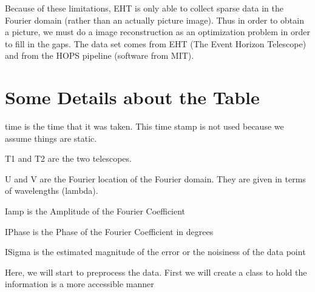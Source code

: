 \documentclass[letterpaper,10pt,english]{jupyterBook}
\begin{document}
\sphinxAtStartPar
Because of these limitations, EHT is only able to collect sparse data in the Fourier domain (rather than an actually picture image). Thus in order to obtain a picture, we must do a image reconstruction as an optimization problem in order to fill in the gaps. The data set comes from EHT (The Event Horizon Telescope) and from the HOPS pipeline (software from MIT).


\section{Some Details about the Table}
\label{\detokenize{data:some-details-about-the-table}}
\sphinxAtStartPar
time is the time that it was taken. This time stamp is not used because we assume things are static.

\sphinxAtStartPar
T1 and T2 are the two telescopes.

\sphinxAtStartPar
U and V are the Fourier location of the Fourier domain. They are given in terms of wavelengths (lambda).

\sphinxAtStartPar
Iamp is the Amplitude of the Fourier Coefficient

\sphinxAtStartPar
IPhase is the Phase of the Fourier Coefficient in degrees

\sphinxAtStartPar
ISigma is the estimated magnitude of the error or the noisiness of the data point

\sphinxAtStartPar
Here, we will start to preprocess the data. First we will create a class to hold the information is a more accessible manner
\end{document}
